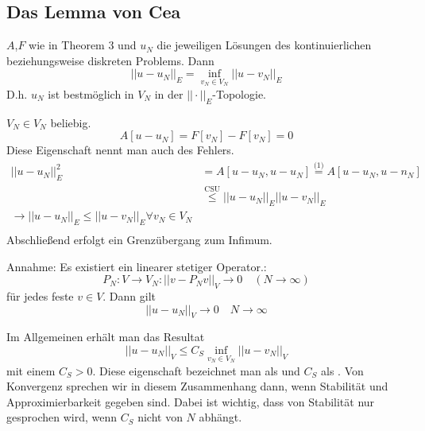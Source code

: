 \begin{bemerkung}
\begin{definition}[Energienorm]
\subsection{Das Lemma von Cea}
\begin{theorem} $A$,$F$ wie in Theorem 3 und $u_N$ die jeweiligen Lösungen des kontinuierlichen beziehungsweise diskreten Problems. Dann
\[||u - u_N||_E = \inf_{v_N \in V_N} ||u-v_N||_E\]
D.h. $u_N$ ist bestmöglich in $V_N$ in der $||\cdot ||_E$-Topologie.
\end{theorem}
\begin{beweis} $V_N \in V_N$ beliebig. 
\begin{equation}
A[u-u_N]=F[v_N]-F[v_N] = 0
\end{equation}
Diese Eigenschaft nennt man auch  des Fehlers.\\
\begin{eqnarray*}
||u-u_N||^2_E &= A[u-u_N, u-u_N] \stackrel{\text{(1)}}{=} A[u-u_N, u-n_N]\\
&\stackrel{\text{CSU}}{\leq} ||u-u_N||_E||u-v_N||_E\\
\rightarrow ||u-u_N||_E \leq ||u-v_N||_E \forall v_N \in V_N\\
\end{eqnarray*}
Abschließend erfolgt ein Grenzübergang zum Infimum.
\end{beweis}
\begin{korollar}[Konvergenz]
Annahme: Es existiert ein linearer stetiger Operator.:
\[P_N: V\to V_N: ||v-P_N v ||_V \to 0 \quad (N \to \infty)\]
für jedes feste $v \in V$. Dann gilt
\[||u-u_N||_V \to 0 \quad N \to \infty\]
\end{korollar}
\begin{bemerkung}
Im Allgemeinen erhält man das Resultat
\[ ||u-u_N||_V \leq C_S \inf_{v_N \in V_N}||u-v_N||_V \]
mit einem $C_S > 0$. Diese eigenschaft bezeichnet man als  und $C_S$ als . Von Konvergenz sprechen wir in diesem Zusammenhang dann, wenn Stabilität und Approximierbarkeit gegeben sind. Dabei ist wichtig, dass von Stabilität nur gesprochen wird, wenn $C_S$ nicht von $N$ abhängt.

\end{bemerkung}
\end{definition}
\end{bemerkung}
